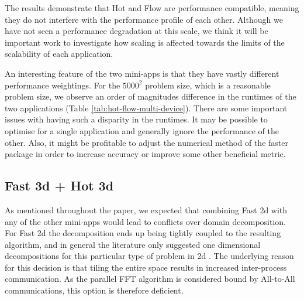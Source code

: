 \documentclass[runningheads,a4paper]{llncs}
\begin{document}
%


The results demonstrate that Hot and Flow are performance compatible, meaning they do not interfere with the performance profile of each other. Although we have not seen a performance degradation at this scale, we think it will be important work to investigate how scaling is affected towards the limits of the scalability of each application.

An interesting feature of the two mini-apps is that they have vastly different performance weightings. For the $5000^2$ problem size, which is a reasonable problem size, we observe an order of magnitudes difference in the runtimes of the two applications (Table \ref{tab:hot-flow-multi-device}). There are some important issues with having such a disparity in the runtimes. It may be possible to optimise for a single application and generally ignore the performance of the other. Also, it might be profitable to adjust the numerical method of the faster package in order to increase accuracy or improve some other beneficial metric.


\subsection{Fast 3d + Hot 3d}

As mentioned throughout the paper, we expected that combining Fast 2d with any of the other mini-apps would lead to conflicts over domain decomposition. For Fast 2d the decomposition ends up being tightly coupled to the resulting algorithm, and in general the literature only suggested one dimensional decompositions for this particular type of problem in 2d \cite{Pissis2008}. The underlying reason for this decision is that tiling the entire space results in increased inter-process communication. As the parallel FFT algorithm is considered bound by All-to-All communications, this option is therefore deficient.
\end{document}
